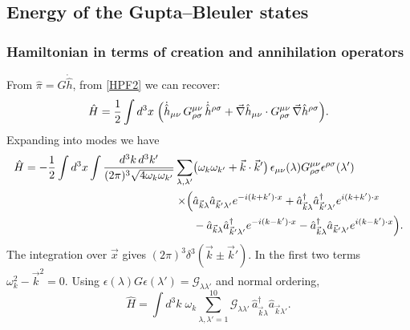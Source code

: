 \documentclass[12pt,a4paper,oneside]{article}
\numberwithin{equation}{section}   %
\begin{document}
\subsection{Energy of the Gupta--Bleuler states}
\label{app:energy}

\subsubsection{Hamiltonian in terms of creation and annihilation operators}
From $\hat\pi=G\dot{\hat h}$, from
\eqref{HPF2} we can recover:
\begin{equation}
\hat H=\frac12\int d^3x\;\Bigl(\dot{\hat h}_{\mu\nu}\,G^{\mu\nu}_{\rho\sigma}\,\dot{\hat h}^{\rho\sigma}
+\vec\nabla\hat{h}_{\mu\nu}\cdot G^{\mu\nu}_{\rho\sigma}\,\vec\nabla\hat{h}^{\rho\sigma}\Bigr) .
\end{equation}
Expanding into modes we have
\begin{equation}
\begin{split}
\hat H=-\frac12\int d^3x\int\frac{d^3k\,d^3k'}{(2\pi)^3\sqrt{4\omega_k\omega_{k'}}}
\sum_{\lambda,\lambda'}&\bigl(\omega_k\omega_{k'}+\vec k\cdot\vec k'\bigr)\,
\epsilon_{\mu\nu}(\lambda)G_{\rho\sigma}^{\mu\nu}\epsilon^{\rho\sigma}(\lambda')\\
\times\Bigl(&\hat a_{\vec k\lambda}\hat a_{\vec k'\lambda'}e^{-i(k+k')\cdot x}
+\hat a^\dagger_{\vec k\lambda}\hat a^\dagger_{\vec k'\lambda'}e^{i(k+k')\cdot x}\\
&-\hat a_{\vec k\lambda}\hat a^\dagger_{\vec k'\lambda'}e^{-i(k-k')\cdot x}
-\hat a^\dagger_{\vec k\lambda}\hat a_{\vec k'\lambda'}e^{i(k-k')\cdot x}\Bigr).
\end{split}
\end{equation}
The integration over $\vec x$ gives $(2\pi)^3\delta^3(\vec k\pm\vec k')$.
In the first two terms $
\omega_k^2-\vec k^2=0$. Using
$\epsilon(\lambda)G\epsilon(\lambda')=\mathcal G_{\lambda\lambda'}$ and normal
ordering,
\begin{equation}
\hat H=\int d^3k\;\omega_k\sum_{\lambda,\lambda'=1}^{10}
\mathcal G_{\lambda\lambda'}\,\hat a^\dagger_{\vec k\lambda}\hat a_{\vec k\lambda'} .
\end{equation}
\end{document}
